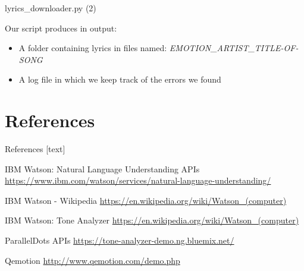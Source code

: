 \documentclass[xcolor=dvipsnames]{beamer}
\begin{document}
\begin{frame}{lyrics\_downloader.py (2)}

Our script produces in output:
\begin{itemize}
\item A folder containing lyrics in files named: \textit{EMOTION\_ARTIST\_TITLE-OF-SONG}
\item A log file in which we keep track of the errors we found
\end{itemize}

\end{frame}


\section{References}
\begin{frame}{References}
[text]
 \begin{thebibliography}{99} %
 IBM Watson: Natural Language Understanding APIs
\newblock \url{https://www.ibm.com/watson/services/natural-language-understanding/}

 IBM Watson - Wikipedia
\newblock \url{https://en.wikipedia.org/wiki/Watson_(computer)}

 IBM Watson: Tone Analyzer
\newblock \url{https://en.wikipedia.org/wiki/Watson_(computer)}

 ParallelDots APIs
\newblock \url{https://tone-analyzer-demo.ng.bluemix.net/}

 Qemotion
\newblock \url{http://www.qemotion.com/demo.php}

\end{thebibliography}

\end{frame}
\end{document}
